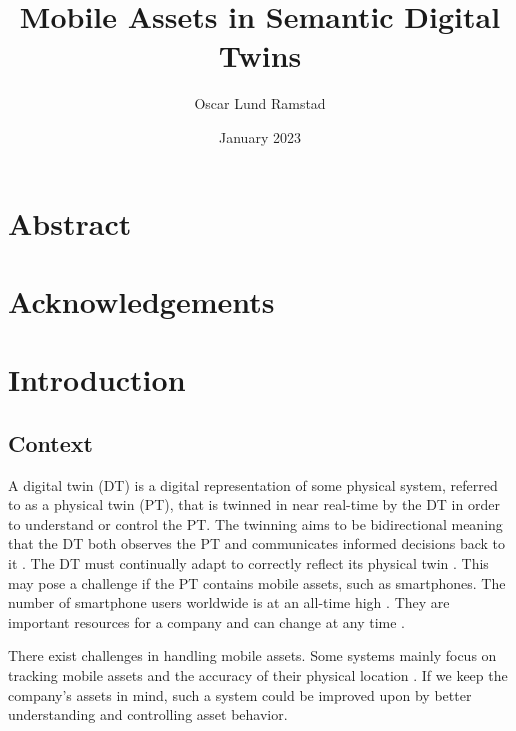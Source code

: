 \documentclass{article}
\begin{document}
\title{Mobile Assets in Semantic Digital Twins}
\author{Oscar Lund Ramstad}
\date{January 2023}

\duoforside[dept={Institute for Informatics}, program={Informatics: Programming and System Architecture}, short]

\section*{Abstract}


\newpage

\section*{Acknowledgements}
\newpage

\tableofcontents
\newpage

\listoftables
\newpage

\listoffigures
\newpage

\setcounter{page}{1}

\section{Introduction}\label{sec:Introduction}
\subsection{Context}
A digital twin (DT) is a digital representation of some physical system, referred to as a physical twin (PT), that is twinned in near real-time by the DT in order to understand or control the PT. The twinning aims to be bidirectional meaning that the DT both observes the PT and communicates informed decisions back to it \cite{kamburjan_digital_2022, fuller_digital_2020}. The DT must continually adapt to correctly reflect its physical twin \cite{kamburjan_twinning-by-construction_2022}. This may pose a challenge if the PT contains mobile assets, such as smartphones. The number of smartphone users worldwide is at an all-time high \cite{petroc_taylor_number_2023}. They are important resources for a company and can change at any time \cite{marcheta_development_2022}.

There exist challenges in handling mobile assets. Some systems mainly focus on tracking mobile assets and the accuracy of their physical location \cite{marcheta_development_2022,akram_design_2021}. If we keep the company's assets in mind, such a system could be improved upon by better understanding and controlling asset behavior. 
\end{document}
